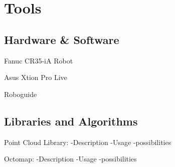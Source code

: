 \chapter{Tools}
\label{chap:tools}
\section{Hardware & Software}
\label{sec: hwsw}
Fanuc CR35-iA Robot

Asus Xtion Pro Live

Roboguide

\section{Libraries and Algorithms}
\label{sec:libalg}

Point Cloud Library:
-Description
-Usage
-possibilities

Octomap:
-Description
-Usage
-possibilities





